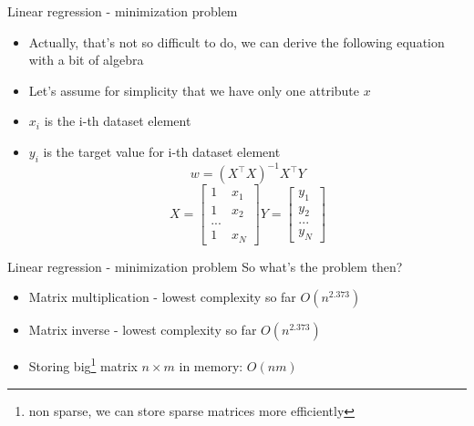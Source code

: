 \documentclass[aspectratio=169]{beamer}
\begin{document}
\begin{frame}{Linear regression - minimization problem}
    \begin{itemize}
        \item Actually, that's not so difficult to do, we can derive the following equation with a bit of algebra
        \item Let's assume for simplicity that we have only one attribute $x$
        \item $x_i$ is the i-th dataset element
        \item $y_i$ is the target value for i-th dataset element
        $$ w = (X^\top X)^{-1}X^\top Y $$
        \[
        X =
          \begin{bmatrix}
            1 & x_1 \\
            1 & x_2 \\
            ... \\
            1 & x_N
          \end{bmatrix}
        Y =
          \begin{bmatrix}
            y_1 \\
            y_2 \\
            ... \\
            y_N
          \end{bmatrix}
        \]
    \end{itemize}
\end{frame}
\begin{frame}{Linear regression - minimization problem}
    So what's the problem then?
    \begin{itemize}
        \item Matrix multiplication - lowest complexity so far $O(n^{2.373})$ \cite{fastmatrix}
        \item Matrix inverse - lowest complexity so far $O(n^{2.373})$
        \item Storing big\footnote{non sparse, we can store sparse matrices more efficiently} matrix $n \times m$ in memory:    $O(nm)$
    \end{itemize}
\end{frame}
\end{document}
